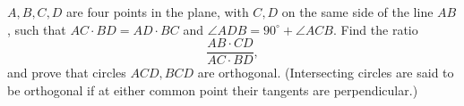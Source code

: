 $A, B, C, D$ are four points in the plane, with $C, D$ on the same side of the line $AB$, such that $AC \cdot BD = AD \cdot BC$ and $\angle ADB = 90^\circ + \angle ACB$. Find the ratio
\[ \frac{AB \cdot CD}{AC \cdot BD}, \]
and prove that circles $ACD, BCD$ are orthogonal. (Intersecting circles are said to be orthogonal if at either common point their tangents are perpendicular.)
